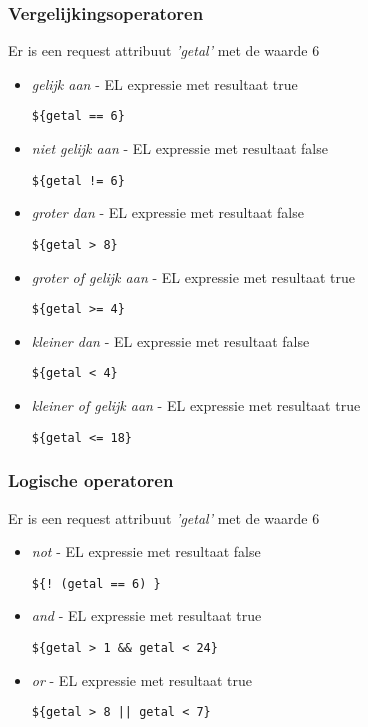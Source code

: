 \documentclass{beamer}
\begin{document}
\begin{frame}[fragile]

\frametitle{Vergelijkingsoperatoren}

Er is een request attribuut \textit{'getal'} met de waarde 6

\begin{itemize}
  \item \textit{gelijk aan} - EL expressie met resultaat true
  \begin{verbatim}${getal == 6}\end{verbatim}
  \item \textit{niet gelijk aan} - EL expressie met resultaat false
  \begin{verbatim}${getal != 6}\end{verbatim}
  \item \textit{groter dan} - EL expressie met resultaat false
  \begin{verbatim}${getal > 8}\end{verbatim}
  \item \textit{groter of gelijk aan} - EL expressie met resultaat true
  \begin{verbatim}${getal >= 4}\end{verbatim}
  \item \textit{kleiner dan} - EL expressie met resultaat false
  \begin{verbatim}${getal < 4}\end{verbatim}
  \item \textit{kleiner of gelijk aan} - EL expressie met resultaat true
  \begin{verbatim}${getal <= 18}\end{verbatim}
\end{itemize}

\end{frame}


\begin{frame}[fragile]

\frametitle{Logische operatoren}

Er is een request attribuut \textit{'getal'} met de waarde 6

\begin{itemize}
  \item \textit{not} - EL expressie met resultaat false 
  \begin{verbatim}${! (getal == 6) }\end{verbatim}
  \item \textit{and} - EL expressie met resultaat true
  \begin{verbatim}${getal > 1 && getal < 24}\end{verbatim}
  \item \textit{or} - EL expressie met resultaat true
  \begin{verbatim}${getal > 8 || getal < 7}\end{verbatim}
\end{itemize}

\end{frame}
\end{document}
